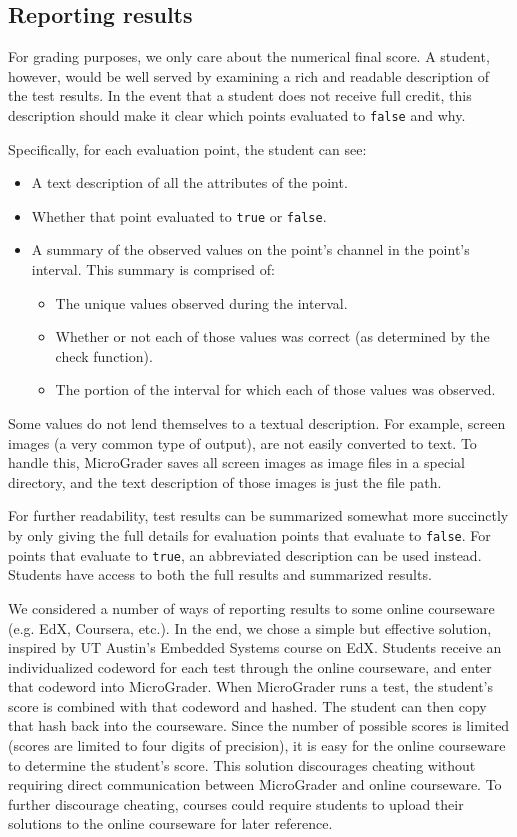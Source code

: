 \documentclass[12pt]{article}
\begin{document}
\subsection{Reporting results}
For grading purposes, we only care about the numerical final score.  A student, however, would be well served by examining a rich and readable description of the test results.  In the event that a student does not receive full credit, this description should make it clear which points evaluated to \texttt{false} and why.

Specifically, for each evaluation point, the student can see:

\begin{itemize}
\item A text description of all the attributes of the point.
\item Whether that point evaluated to \texttt{true} or \texttt{false}.
\item A summary of the observed values on the point's channel in the point's interval.  This summary is comprised of:
\begin{itemize}
\item The unique values observed during the interval.
\item Whether or not each of those values was correct (as determined by the check function).
\item The portion of the interval for which each of those values was observed.
\end{itemize}
\end{itemize}

Some values do not lend themselves to a textual description.  For example, screen images (a very common type of output), are not easily converted to text.  To handle this, MicroGrader saves all screen images as image files in a special directory, and the text description of those images is just the file path.

For further readability, test results can be summarized somewhat more succinctly by only giving the full details for evaluation points that evaluate to \texttt{false}.  For points that evaluate to \texttt{true}, an abbreviated description can be used instead.  Students have access to both the full results and summarized results.

We considered a number of ways of reporting results to some online courseware (e.g. EdX, Coursera, etc.).  In the end, we chose a simple but effective solution, inspired by UT Austin's Embedded Systems course on EdX.  Students receive an individualized codeword for each test through the online courseware, and enter that codeword into MicroGrader.  When MicroGrader runs a test, the student's score is combined with that codeword and hashed.  The student can then copy that hash back into the courseware.  Since the number of possible scores is limited (scores are limited to four digits of precision), it is easy for the online courseware to determine the student's score.  This solution discourages cheating without requiring direct communication between MicroGrader and online courseware.  To further discourage cheating, courses could require students to upload their solutions to the online courseware for later reference.
\end{document}
